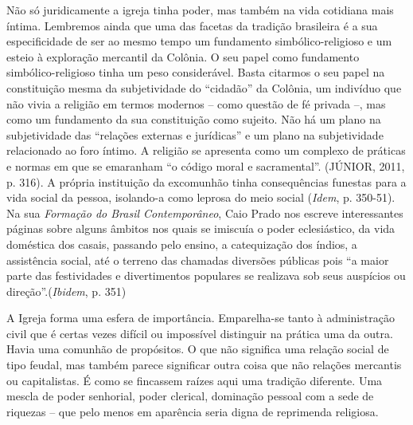 Não só juridicamente a igreja tinha poder, mas também na vida cotidiana
mais íntima. Lembremos ainda que uma das facetas da tradição brasileira
é a sua especificidade de ser ao mesmo tempo um fundamento
simbólico-religioso e um esteio à exploração mercantil da Colônia. O seu
papel como fundamento simbólico-religioso tinha um peso considerável.
Basta citarmos o seu papel na constituição mesma da subjetividade do
``cidadão'' da Colônia, um indivíduo que não vivia a religião em termos
modernos -- como questão de fé privada --, mas como um fundamento da sua
constituição como sujeito. Não há um plano na subjetividade das
``relações externas e jurídicas'' e um plano na subjetividade
relacionado ao foro íntimo. A religião se apresenta como um complexo de
práticas e normas em que se emaranham ``o código moral e sacramental''.
(JÚNIOR, 2011, p. 316). A própria instituição da excomunhão tinha
consequências funestas para a vida social da pessoa, isolando-a como
leprosa do meio social (\emph{Idem}, p. 350-51). Na sua \emph{Formação
do Brasil Contemporâneo}, Caio Prado nos escreve interessantes páginas
sobre alguns âmbitos nos quais se imiscuía o poder eclesiástico, da vida
doméstica dos casais, passando pelo ensino, a catequização dos índios, a
assistência social, até o terreno das chamadas diversões públicas pois
``a maior parte das festividades e divertimentos populares se realizava
sob seus auspícios ou direção''.(\emph{Ibidem}, p. 351)

A Igreja forma uma esfera de importância. Emparelha-se tanto à
administração civil que é certas vezes difícil ou impossível distinguir
na prática uma da outra. Havia uma comunhão de propósitos. O que não
significa uma relação social de tipo feudal, mas também parece
significar outra coisa que não relações mercantis ou capitalistas. É
como se fincassem raízes aqui uma tradição diferente. Uma mescla de
poder senhorial, poder clerical, dominação pessoal com a sede de
riquezas -- que pelo menos em aparência seria digna de reprimenda
religiosa.

